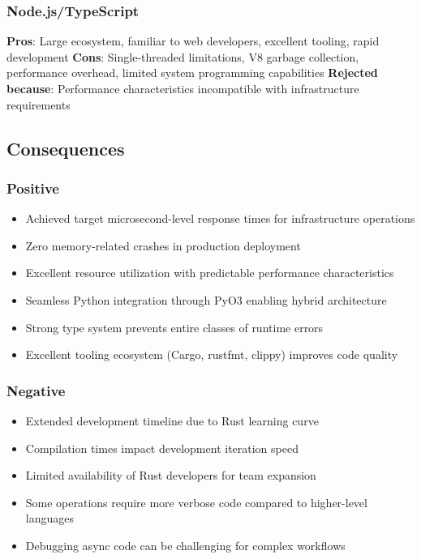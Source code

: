 \subsubsection*{Node.js/TypeScript}
\textbf{Pros}: Large ecosystem, familiar to web developers, excellent tooling, rapid development
\textbf{Cons}: Single-threaded limitations, V8 garbage collection, performance overhead, limited system programming capabilities
\textbf{Rejected because}: Performance characteristics incompatible with infrastructure requirements

\subsection*{Consequences}

\subsubsection*{Positive}
\begin{itemize}
\item Achieved target microsecond-level response times for infrastructure operations
\item Zero memory-related crashes in production deployment
\item Excellent resource utilization with predictable performance characteristics
\item Seamless Python integration through PyO3 enabling hybrid architecture
\item Strong type system prevents entire classes of runtime errors
\item Excellent tooling ecosystem (Cargo, rustfmt, clippy) improves code quality
\end{itemize}

\subsubsection*{Negative}
\begin{itemize}
\item Extended development timeline due to Rust learning curve
\item Compilation times impact development iteration speed
\item Limited availability of Rust developers for team expansion
\item Some operations require more verbose code compared to higher-level languages
\item Debugging async code can be challenging for complex workflows
\end{itemize}

